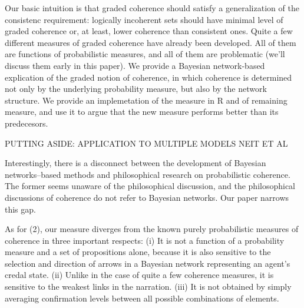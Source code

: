 \documentclass[10pt,]{scrartcl}
\begin{document}
  Our basic intuition is that graded coherence should satisfy  a generalization of the consistenc requirement: logically incoherent sets should have minimal level of graded coherence or, at least, lower coherence than consistent ones.   Quite a few different measures of graded coherence have already been developed. All of them are functions of probabilistic measures, and all of them are problematic (we'll discuss  them  early in this paper).  We provide a Bayesian network-based explication of the graded notion of coherence, in which    coherence is determined not only by the underlying probability measure, but also by the network structure. We provide an implemetation of the measure in \textsf{R} and of remaining measure, and use it to argue that the new measure performs better than its predecesors. 





PUTTING ASIDE: APPLICATION TO MULTIPLE MODELS NEIT ET AL


Interestingly, there is a disconnect between  the development of  Bayesian networks--based methods and  philosophical research on probabilistic coherence. The former seems  unaware of the philosophical discussion, and the philosophical discussions of coherence do not refer to  Bayesian networks. Our paper  narrows this gap.
















As for (2), our measure diverges from the known purely probabilistic measures of coherence in three important
respects: (i) It is not a function of a probability measure and a set
of propositions alone, because it is also sensitive to the selection and
direction of arrows in a Bayesian network representing an agent's credal state. (ii) Unlike in the case of quite a few coherence measures, it is  sensitive to
 the  weakest links in the narration.
(iii) It is not obtained by simply averaging confirmation levels between all possible combinations of elements.
\end{document}
